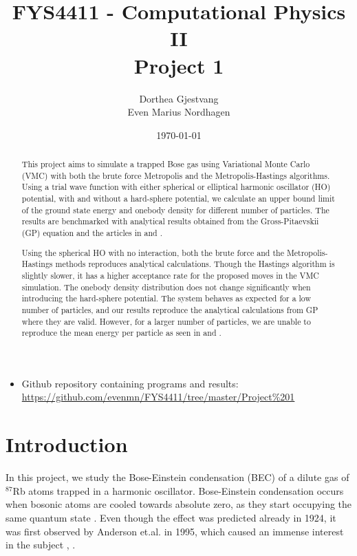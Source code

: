 \documentclass[norsk,a4paper,12pt]{article}
\title{FYS4411 - Computational Physics II\\\vspace{2mm} \Large{Project 1}}
\author{\large Dorthea Gjestvang\\ Even Marius Nordhagen}
\date\today
\begin{document}
\maketitle

\begin{itemize}
\item Github repository containing programs and results: \\\url{https://github.com/evenmn/FYS4411/tree/master/Project%201}
\end{itemize}

\begin{abstract}
This project aims to simulate a trapped Bose gas using Variational Monte Carlo (VMC) with both the  brute force Metropolis and the Metropolis-Hastings algorithms. Using a trial wave function with either spherical or elliptical harmonic oscillator (HO) potential, with and without a hard-sphere potential, we calculate an upper bound limit of the ground state energy and onebody density for different number of particles. The results are benchmarked with analytical results obtained from the Gross-Pitaevskii (GP) equation and the articles in \cite{DuBois} and \cite{Dalfovo}. \par 

Using the spherical HO with no interaction, both the brute force and the Metropolis-Hastings methods reproduces analytical calculations. Though the Hastings algorithm is slightly slower, it has a higher acceptance rate for the proposed moves in the VMC simulation. The onebody density distribution does not change significantly when introducing the hard-sphere potential. The system behaves as expected for a low number of particles, and our results reproduce the analytical calculations from GP where they are valid. However, for a larger number of particles, we are unable to reproduce the mean energy per particle as seen in \cite{DuBois} and \cite{Dalfovo}.
\par 

\end{abstract}

\newpage

\tableofcontents

\newpage

\section{Introduction}

In this project, we study the Bose-Einstein condensation (BEC) of a dilute gas of $^{87}$Rb atoms trapped in a harmonic oscillator. Bose-Einstein condensation occurs when bosonic atoms are cooled towards absolute zero, as they start occupying the same quantum state \cite{JE2016}. Even though the effect was predicted already in 1924, it was first observed by Anderson et.al. in 1995, which caused an immense interest in the subject \cite{SP}, \cite{Anderson}.
\end{document}
